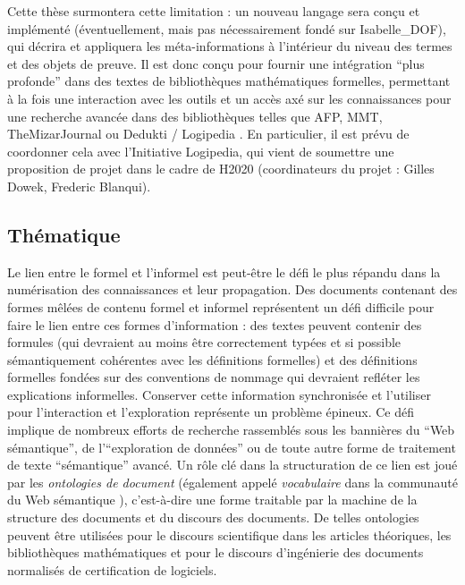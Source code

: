 \documentclass[a4paper,10pt]{article}
\begin{document}
Cette thèse surmontera cette limitation :
un nouveau langage sera conçu et implémenté
(éventuellement, mais pas nécessairement fondé sur Isabelle\_DOF),
qui décrira et appliquera les méta-informations
à l'intérieur du niveau des termes et des objets de preuve.
Il est donc conçu pour fournir une intégration \enquote{plus profonde}
dans des textes de bibliothèques mathématiques formelles,
permettant à la fois une interaction avec les outils
et un accès axé sur les connaissances
pour une recherche avancée dans des bibliothèques
telles que AFP, MMT, TheMizarJournal ou Dedukti / Logipedia
\cite {afp,mmt,TheMizarJournal,dedukti}.
En particulier, il est prévu de coordonner cela
avec l'Initiative Logipedia,
qui vient de soumettre une proposition de projet dans le cadre de H2020
(coordinateurs du projet : Gilles Dowek, Frederic Blanqui).

\subsection*{Thématique}

Le lien entre le formel et l'informel est peut-être
le défi le plus répandu dans la numérisation des connaissances
et leur propagation.
Des documents contenant
des formes mêlées de contenu formel et informel représentent
un défi difficile pour faire le lien entre ces formes d'information :
des textes peuvent contenir des formules
(qui devraient au moins être correctement typées
et si possible sémantiquement cohérentes avec les définitions formelles)
et des définitions formelles fondées sur des conventions de nommage
qui devraient refléter les explications informelles.
Conserver cette information synchronisée
et l'utiliser pour l'interaction et l'exploration représente
un problème épineux.
Ce défi implique de nombreux efforts de recherche
rassemblés sous les bannières du \enquote{Web sémantique},
de l'\enquote{exploration de données}
ou de toute autre forme de traitement de texte \enquote{sémantique} avancé.
Un rôle clé dans la structuration de ce lien est joué
par les \emph{ontologies de document}
(également appelé \emph{vocabulaire} dans la communauté du Web sémantique
\cite{owlgred}),
c'est-à-dire une forme traitable par la machine de la structure des documents
et du discours des documents.
De telles ontologies peuvent être utilisées
pour le discours scientifique dans les articles théoriques,
les bibliothèques mathématiques
et pour le discours d'ingénierie des documents normalisés
de certification de logiciels.
\end{document}

